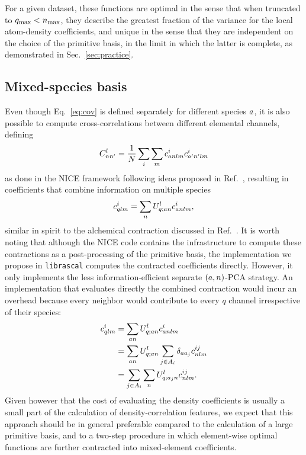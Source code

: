 For a given dataset, these functions are optimal in the sense that when truncated to $q_\mathrm{max}<n_\mathrm{max}$, they describe the greatest fraction of the variance for the local atom-density coefficients, and unique in the sense that they are independent on the choice of the primitive basis, in the limit in which the latter is complete, as demonstrated in Sec.~\ref{sec:practice}.

\subsection{Mixed-species basis}

Even though Eq.~\eqref{eq:cov} is defined separately for different species $a$, it is also possible to compute cross-correlations between different elemental channels, defining
\begin{equation}
  C^{l}_{nn'}= \frac{1}{N} \sum_i \sum_m c^i_{a nlm}c^i_{a^\prime n^\prime lm} 
\label{eq:cov-multispecies}
\end{equation}
as done in the NICE framework\cite{niga+20jcp} following ideas proposed in Ref.~, resulting in coefficients that combine information on multiple species
\begin{equation}
  c^i_{qlm} = \sum_n U^{l}_{q;a n} c^i_{a nlm}, \label{eq:contract-multispecies}
\end{equation}
similar in spirit to the alchemical contraction discussed in Ref.~.
It is worth noting that although the NICE code\cite{NICE-REPO} contains the infrastructure to compute these contractions as a post-processing of the primitive basis, the implementation we propose in \texttt{librascal}\cite{LIBRASCAL} computes the contracted coefficients directly. However, it only implements the less information-efficient separate $(a, n)$-PCA strategy.
An implementation that evaluates directly the combined contraction would incur an overhead because every neighbor would contribute to every $q$ channel irrespective of their species:
\begin{align}
  c^i_{qlm}  &= \sum_{a n} U^l_{q; a n} c^{i}_{a nlm} \\
             &= \sum_{a n} U^l_{q; a n} \sum_{j\in A_i} \delta_{a a_j} c^{ij}_{nlm} \\
             &= \sum_{j\in A_i} \sum_{n} U^l_{q; a_j n} c^{ij}_{nlm}.
\end{align}
Given however that the cost of evaluating the density coefficients is usually a small part of the calculation of density-correlation features\cite{caro2019optimizing,musil2021efficient}, we expect that this approach should be in general preferable compared to the calculation of a large primitive basis, and to a two-step procedure in which element-wise optimal functions are further contracted into mixed-element coefficients.

